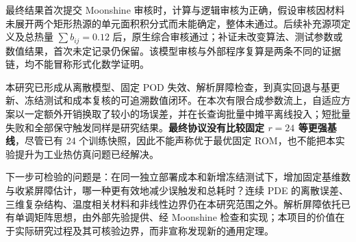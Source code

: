 最终结果首次提交 Moonshine 审核时，计算与逻辑审核为正确，假设审核因材料未展开两个矩形热源的单元面积积分式而未能确定，整体未通过。后续补充源项定义及总热量 $\sum b_{ij}=0.12$ 后，原生综合审核通过；补证未改变算法、测试参数或数值结果，首次未定记录仍保留。该模型审核与外部程序复算是两条不同的证据链，均不能冒称形式化数学证明。

本研究已形成从离散模型、固定 POD 失效、解析屏障检查，到真实回退与基更新、冻结测试和成本复核的可追溯数值闭环。在本次有限合成参数流上，自适应方案以一定额外开销换取了较小的场误差，并在长查询批量中摊平离线投入；短批量失败和全部保守触发同样是研究结果。\textbf{最终协议没有比较固定 $r=24$ 等更强基线}，尽管已有 24 个训练快照，因此不能声称优于最优固定 ROM，也不能把本实验提升为工业热仿真问题已经解决。

下一步可检验的问题是：在同一独立部署成本和新增冻结测试下，增加固定基维数与收紧屏障估计，哪一种更有效地减少误触发和总耗时？连续 PDE 的离散误差、三维复杂结构、温度相关材料和非线性边界仍在本研究范围之外。解析屏障依托已有单调矩阵思想，由外部先验提供、经 Moonshine 检查和实现；本项目的价值在于实际研究过程及其可核验边界，而非宣称发现新的通用定理。
